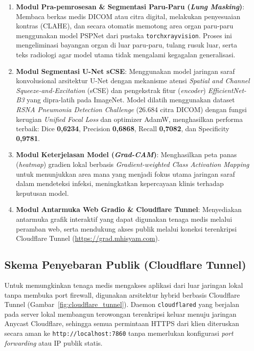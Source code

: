 \documentclass[12pt,a4paper]{article}
\begin{document}
\begin{enumerate}
    \item \textbf{Modul Pra-pemrosesan \& Segmentasi Paru-Paru
    (\textit{Lung Masking})}: Membaca berkas medis DICOM atau citra digital,
    melakukan penyesuaian kontras (CLAHE), dan secara otomatis memotong area
    organ paru-paru menggunakan model PSPNet dari pustaka
    \texttt{torchxrayvision}. Proses ini mengeliminasi bayangan organ di luar
    paru-paru, tulang rusuk luar, serta teks radiologi agar model utama tidak
    mengalami kegagalan generalisasi.

    \item \textbf{Modul Segmentasi U-Net sCSE}: Menggunakan model jaringan
    saraf konvolusional arsitektur U-Net dengan mekanisme atensi \textit{Spatial
    and Channel Squeeze-and-Excitation} (sCSE) dan pengekstrak fitur
    (\textit{encoder}) \textit{EfficientNet-B3} yang dipra-latih pada ImageNet.
    Model dilatih menggunakan dataset \textit{RSNA Pneumonia Detection Challenge}
    (26.684 citra DICOM) dengan fungsi kerugian \textit{Unified Focal Loss} dan
    optimizer AdamW, menghasilkan performa terbaik: Dice \textbf{0,6234},
    Precision \textbf{0,6868}, Recall \textbf{0,7082}, dan Specificity
    \textbf{0,9781}.

    \item \textbf{Modul Keterjelasan Model (\textit{Grad-CAM})}: Menghasilkan
    peta panas (\textit{heatmap}) gradien lokal berbasis \textit{Gradient-weighted
    Class Activation Mapping} untuk menunjukkan area mana yang menjadi fokus
    utama jaringan saraf dalam mendeteksi infeksi, meningkatkan kepercayaan klinis
    terhadap keputusan model.

    \item \textbf{Modul Antarmuka Web Gradio \& Cloudflare Tunnel}: Menyediakan
    antarmuka grafik interaktif yang dapat digunakan tenaga medis melalui
    peramban web, serta mendukung akses publik melalui koneksi terenkripsi
    Cloudflare Tunnel (\url{https://grad.mhisyam.com}).
\end{enumerate}

\subsection{Skema Penyebaran Publik (Cloudflare Tunnel)}

Untuk memungkinkan tenaga medis mengakses aplikasi dari luar jaringan lokal
tanpa membuka port firewall, digunakan arsitektur hybrid berbasis Cloudflare
Tunnel (Gambar~\ref{fig:cloudflare_tunnel}). Daemon \texttt{cloudflared} yang
berjalan pada server lokal membangun terowongan terenkripsi keluar menuju
jaringan Anycast Cloudflare, sehingga semua permintaan HTTPS dari klien
diteruskan secara aman ke \texttt{http://localhost:7860} tanpa memerlukan
konfigurasi \textit{port forwarding} atau IP publik statis.
\end{document}
